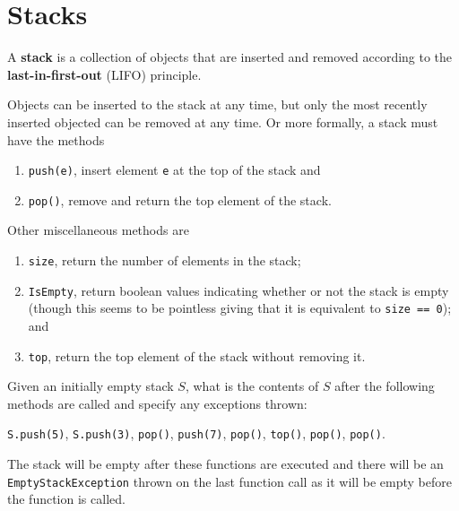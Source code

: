 \section{Stacks}

\begin{definition}
    A \textbf{stack} is a collection of objects that are inserted and removed according to the \textbf{last-in-first-out} (LIFO) principle.
    
    Objects can be inserted to the stack at any time, but only the most recently inserted objected can be removed at any time. Or more formally, a stack must have the methods
    
    \begin{enumerate}
        \item \texttt{push(e)}, insert element \texttt{e} at the top of the stack and
        \item \texttt{pop()}, remove and return the top element of the stack.
    \end{enumerate}
    
    Other miscellaneous methods are
    \begin{enumerate}[resume]
        \item \texttt{size}, return the number of elements in the stack;
        \item \texttt{IsEmpty}, return boolean values indicating whether or not the stack is empty (though this seems to be pointless giving that it is equivalent to \texttt{size == 0}); and
        \item \texttt{top}, return the top element of the stack without removing it.
    \end{enumerate}
\end{definition}

\begin{example}
    Given an initially empty stack $S$, what is the contents of $S$ after the following methods are called and specify any exceptions thrown:
    \begin{center}
        \texttt{S.push(5)}, \quad \texttt{S.push(3)}, \quad \texttt{pop()}, \quad \texttt{push(7)}, \quad \texttt{pop()}, \quad \texttt{top()}, \quad \texttt{pop()}, \quad \texttt{pop()}.
    \end{center}
    
    The stack will be empty after these functions are executed and there will be an \texttt{EmptyStackException} thrown on the last function call as it will be empty before the function is called.
\end{example}

